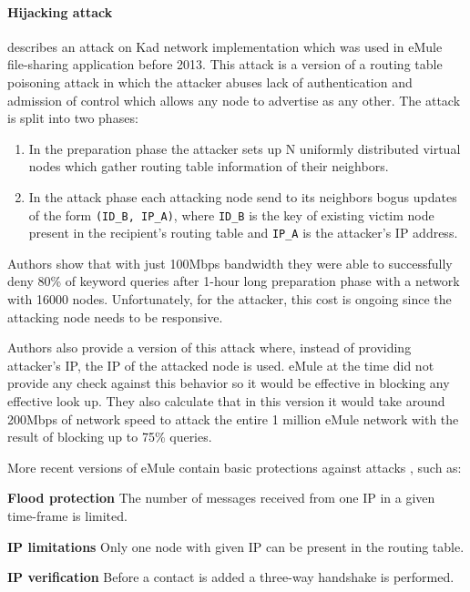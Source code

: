 \paragraph{Hijacking attack}
\cite{wan08} describes an attack on Kad network implementation which was used
in eMule file-sharing application before 2013. This attack is a version of a
routing table poisoning attack in which the attacker abuses lack of
authentication and admission of control which allows any node to advertise as
any other. The attack is split into two phases:
\begin{enumerate}
  \item In the preparation phase the attacker sets up N uniformly distributed
    virtual nodes which gather routing table information of their neighbors.
  \item In the attack phase each attacking node send to its neighbors bogus
    updates of the form \texttt{(ID\_B, IP\_A)}, where \texttt{ID\_B} is the key
    of existing victim node present in the recipient's routing table and
    \texttt{IP\_A} is the attacker's IP address.
\end{enumerate}

Authors show that with just 100Mbps bandwidth they were able to successfully
deny 80\% of keyword queries after 1-hour long preparation phase with a
network with 16000 nodes. Unfortunately, for the attacker, this cost is ongoing
since the attacking node needs to be responsive.

Authors also provide a version of this attack where, instead of providing
attacker's IP, the IP of the attacked node is used. eMule at the time did not
provide any check against this behavior so it would be effective in blocking
any effective look up. They also calculate that in this version it would take
around 200Mbps of network speed to attack the entire 1 million eMule network
with the result of blocking up to 75\% queries.

More recent versions of eMule contain basic protections against attacks
\cite{tim11}, such as:
\begin{description}
  \item{\textbf{Flood protection}} The number of messages received from one IP
    in a given time-frame is limited.
  \item{\textbf{IP limitations}} Only one node with given IP can be present in
    the routing table.
  \item{\textbf{IP verification}} Before a contact is added a three-way
    handshake is performed.
\end{description}

